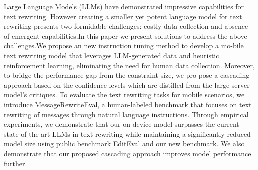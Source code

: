 Large Language Models (LLMs) have demonstrated impressive capabilities for text rewriting.   However  creating  a  smaller  yet  potent language  model  for  text  rewriting  presents two  formidable  challenges:   costly  data  collection  and  absence  of  emergent  capabilities.In this paper we present solutions to address the  above  challenges.We  propose  an  new instruction  tuning  method  to  develop  a  mo-bile text rewriting model that leverages LLM-generated  data  and  heuristic  reinforcement learning, eliminating the need for human data collection. Moreover,  to  bridge  the  performance  gap  from  the  constraint  size,  we  pro-pose a cascading approach based on the confidence levels which are distilled from the large server model’s critiques.  To evaluate the text rewriting  tasks  for  mobile  scenarios,  we  introduce MessageRewriteEval, a human-labeled benchmark that focuses on text rewriting of messages through natural language instructions. Through  empirical  experiments, we demonstrate that our on-device model surpasses  the  current  state-of-the-art  LLMs  in text rewriting while maintaining a significantly reduced  model  size  using  public  benchmark EditEval and our new benchmark.  We also demonstrate  that  our  proposed  cascading  approach improves model performance further.